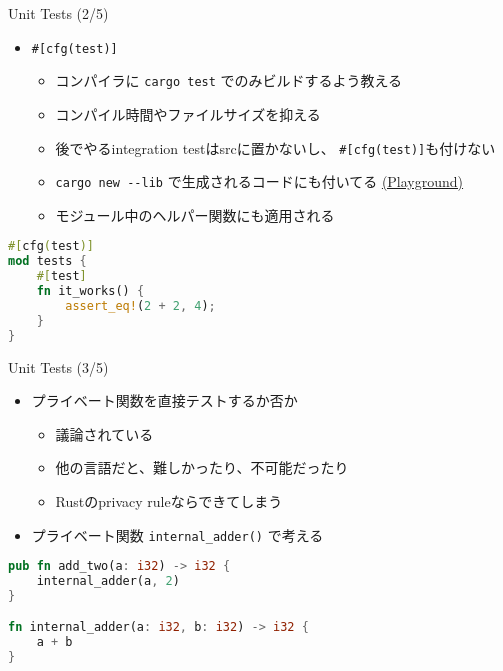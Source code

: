 \documentclass[cjk,14pt,xcolor=dvipsnames,table,dvipdfmx,professional font,t,fragile]{beamer}
\begin{document}
\begin{frame}[fragile]{Unit Tests (2/5)}
 \begin{itemize}
  \item \verb|#[cfg(test)]|
	\begin{itemize}
	 \item コンパイラに \verb|cargo test| でのみビルドするよう教える
	 \item コンパイル時間やファイルサイズを抑える
	 \item 後でやるintegration testはsrcに置かないし、
	       \verb|#[cfg(test)]|も付けない
	 \item \verb|cargo new --lib| で生成されるコードにも付いてる
	       \href{https://play.integer32.com/?version=stable&mode=debug&edition=2018&gist=ce8ee04d2dcc2311a14efc8090ebda51}
	       {(Playground)}
	 \item モジュール中のヘルパー関数にも適用される
	\end{itemize}
 \end{itemize}
 {\scriptsize
 \begin{lstlisting}[language=Rust,style=boxed,style=colouredRust]
#[cfg(test)]
mod tests {
    #[test]
    fn it_works() {
        assert_eq!(2 + 2, 4);
    }
}\end{lstlisting}}
\end{frame}

\begin{frame}[fragile]{Unit Tests (3/5)}
 \begin{itemize}
  \item プライベート関数を直接テストするか否か
	\begin{itemize}
	 \item 議論されている
	 \item 他の言語だと、難しかったり、不可能だったり
	 \item Rustのprivacy ruleならできてしまう
	\end{itemize}
  \item プライベート関数 \verb|internal_adder()| で考える
 \end{itemize}
 {\scriptsize
 \begin{lstlisting}[language=Rust,style=boxed,style=colouredRust]
pub fn add_two(a: i32) -> i32 {
    internal_adder(a, 2)
}

fn internal_adder(a: i32, b: i32) -> i32 {
    a + b
}\end{lstlisting}}
\end{frame}
\end{document}
